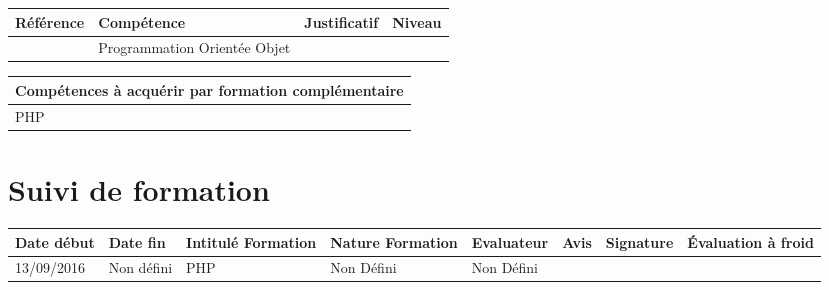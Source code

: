 \documentclass[11pt]{article}
\begin{document}
\centering
	\begin{longtable}{|p{}|p{}|p{}|p{}|}
	\hline
	\rowcolor{gray!40} Référence & Compétence & Justificatif & Niveau \\
	\hline
	  & Programmation Orientée Objet &  &  \\
	 \hline
	\end{longtable}

\centering
	\begin{longtable}{|p{}|}
	\hline
	\rowcolor{gray!40} Compétences à acquérir par formation complémentaire \\
	\hline
	 PHP \\
	\hline
	\end{longtable}

\section*{\large Suivi de formation}

\centering

	\begin{longtable}{|p{}|p{}|p{}|p{}|p{}|p{}|p{}|p{}|}
	
	\hline
	\rowcolor{gray!40} \tiny Date début & \tiny Date fin & \tiny Intitulé Formation & \tiny Nature Formation & \tiny Evaluateur & \tiny Avis & \tiny Signature & \tiny Évaluation à froid \\
	\hline
	13/09/2016 & Non défini & PHP & Non Défini & Non Défini & & & \\
	\hline
	\end{longtable}
\end{document}
